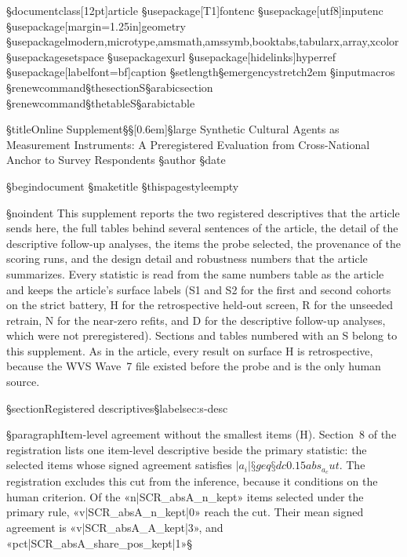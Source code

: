 §documentclass[12pt]{article}
§usepackage[T1]{fontenc}
§usepackage[utf8]{inputenc}
§usepackage[margin=1.25in]{geometry}
§usepackage{lmodern,microtype,amsmath,amssymb,booktabs,tabularx,array,xcolor}
§usepackage{setspace}
§usepackage{xurl}
§usepackage[hidelinks]{hyperref}
§usepackage[labelfont=bf]{caption}
§setlength{§emergencystretch}{2em}
§input{macros}
§renewcommand{§thesection}{S§arabic{section}}
§renewcommand{§thetable}{S§arabic{table}}

§title{Online Supplement§§[0.6em]§large Synthetic Cultural Agents as Measurement Instruments: A Preregistered Evaluation from Cross-National Anchor to Survey Respondents}
§author{}
§date{}

§begin{document}
§maketitle
§thispagestyle{empty}

§noindent This supplement reports the two registered descriptives that the article sends here, the full tables behind several sentences of the article, the detail of the descriptive follow-up analyses, the items the probe selected, the provenance of the scoring runs, and the design detail and robustness numbers that the article summarizes. Every statistic is read from the same numbers table as the article and keeps the article's surface labels (S1 and S2 for the first and second cohorts on the strict battery, H for the retrospective held-out screen, R for the unseeded retrain, N for the near-zero refits, and D for the descriptive follow-up analyses, which were not preregistered). Sections and tables numbered with an S belong to this supplement. As in the article, every result on surface H is retrospective, because the WVS Wave~7 file existed before the probe and is the only human source.

§section{Registered descriptives}§label{sec:s-desc}

§paragraph{Item-level agreement without the smallest items (H).} Section~8 of the registration lists one item-level descriptive beside the primary statistic: the selected items whose signed agreement satisfies $|a_i|§geq §dc{0.15}{abs_a_cut}$. The registration excludes this cut from the inference, because it conditions on the human criterion. Of the «n|SCR_absA_n_kept» items selected under the primary rule, «v|SCR_absA_n_kept|0» reach the cut. Their mean signed agreement is «v|SCR_absA_A_kept|3», and «pct|SCR_absA_share_pos_kept|1»§%

